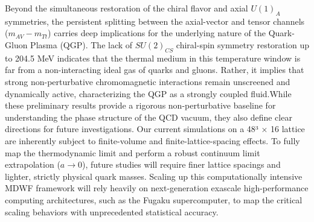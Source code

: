 Beyond the simultaneous restoration of the chiral flavor and axial $U(1)_{A}$ symmetries, the persistent splitting between the axial-vector and tensor channels ($m_{AV} - m_{Tt}$) carries deep implications for the underlying nature of the Quark-Gluon Plasma (QGP). The lack of $SU(2)_{CS}$ chiral-spin symmetry restoration up to 204.5 MeV indicates that the thermal medium in this temperature window is far from a non-interacting ideal gas of quarks and gluons. Rather, it implies that strong non-perturbative chromomagnetic interactions remain unscreened and dynamically active, characterizing the QGP as a strongly coupled fluid.While these preliminary results provide a rigorous non-perturbative baseline for understanding the phase structure of the QCD vacuum, they also define clear directions for future investigations. Our current simulations on a 48³ × 16 lattice are inherently subject to finite-volume and finite-lattice-spacing effects. To fully map the thermodynamic limit and perform a robust continuum limit extrapolation ($a \rightarrow 0$), future studies will require finer lattice spacings and lighter, strictly physical quark masses. Scaling up this computationally intensive MDWF framework will rely heavily on next-generation exascale high-performance computing architectures, such as the Fugaku supercomputer, to map the critical scaling behaviors with unprecedented statistical accuracy.
